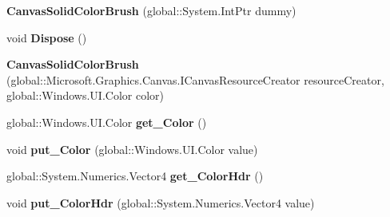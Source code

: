 \begin{DoxyCompactItemize}
{\bfseries Canvas\+Solid\+Color\+Brush} (global\+::\+System.\+Int\+Ptr dummy)
\item 
\mbox{\label{class_microsoft_1_1_graphics_1_1_canvas_1_1_brushes_1_1_canvas_solid_color_brush_a46f1e2e21dc08f8da7c1a89fd59311fc}} 
void {\bfseries Dispose} ()
\item 
\mbox{\label{class_microsoft_1_1_graphics_1_1_canvas_1_1_brushes_1_1_canvas_solid_color_brush_a6a9cfff8962b0007c46d54d3d60cd93f}} 
{\bfseries Canvas\+Solid\+Color\+Brush} (global\+::\+Microsoft.\+Graphics.\+Canvas.\+I\+Canvas\+Resource\+Creator resource\+Creator, global\+::\+Windows.\+U\+I.\+Color color)
\item 
\mbox{\label{class_microsoft_1_1_graphics_1_1_canvas_1_1_brushes_1_1_canvas_solid_color_brush_ac3b79256cdb5b26bcce81d701c5d722a}} 
global\+::\+Windows.\+U\+I.\+Color {\bfseries get\+\_\+\+Color} ()
\item 
\mbox{\label{class_microsoft_1_1_graphics_1_1_canvas_1_1_brushes_1_1_canvas_solid_color_brush_aa06a0ab02b8270177161c16f123f8c50}} 
void {\bfseries put\+\_\+\+Color} (global\+::\+Windows.\+U\+I.\+Color value)
\item 
\mbox{\label{class_microsoft_1_1_graphics_1_1_canvas_1_1_brushes_1_1_canvas_solid_color_brush_a9bcb646ebe3917306b5c7b2ce19e680c}} 
global\+::\+System.\+Numerics.\+Vector4 {\bfseries get\+\_\+\+Color\+Hdr} ()
\item 
\mbox{\label{class_microsoft_1_1_graphics_1_1_canvas_1_1_brushes_1_1_canvas_solid_color_brush_adb106fa11eb5a9793fe66e8d8017ce59}} 
void {\bfseries put\+\_\+\+Color\+Hdr} (global\+::\+System.\+Numerics.\+Vector4 value)
\item 
\mbox{\label{class_microsoft_1_1_graphics_1_1_canvas_1_1_brushes_1_1_canvas_solid_color_brush_a248f584e094e4e9ec4bcd3b1fa94029b}} 

\end{DoxyCompactItemize}
